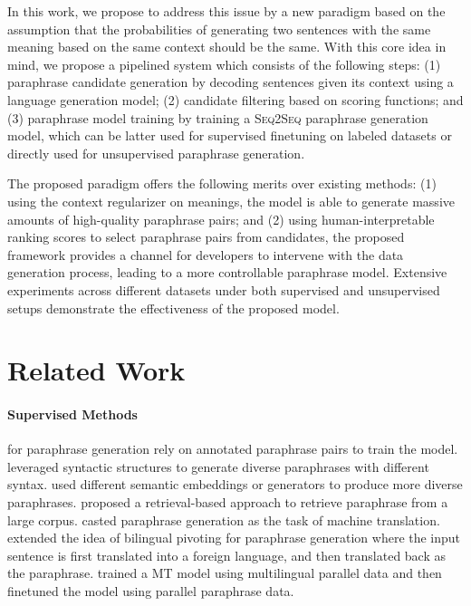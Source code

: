 \documentclass[11pt,a4paper]{article}
\newcommand{\sts}{{{\textsc{Seq2Seq}}}\xspace}
\begin{document}
In this work, we propose 
to address this issue 
by a new paradigm
based
 on the assumption that the probabilities of generating two sentences with the same meaning based on the same context should be the same.
  With this core idea in mind, 
  we propose a pipelined system which consists of  
  the following steps: 
(1) paraphrase candidate generation  by decoding  sentences given its context using a language generation model;
(2) candidate filtering based on scoring functions; and 
(3) paraphrase model training by
training a \sts paraphrase generation model, which can be latter used for supervised finetuning on labeled datasets or  directly used for unsupervised paraphrase generation. 
  
  

The proposed paradigm offers the following merits over existing methods: (1)
using the context regularizer on meanings, 
 the model is able to generate massive amounts 
 of high-quality paraphrase pairs; 
and (2)  using human-interpretable ranking scores to select paraphrase pairs from candidates, the proposed framework provides a channel for developers to intervene with the data generation process, leading
to a more controllable paraphrase model. 
Extensive experiments across different datasets under both supervised and unsupervised setups demonstrate 
the effectiveness of the proposed model. 

\section{Related Work}  

\paragraph{Supervised Methods} 
for paraphrase generation rely on annotated paraphrase pairs to train the model.
\citet{iyyer2018adversarial,li-etal-2019-decomposable,chen2019controllable,goyal2020neural} leveraged syntactic structures to generate diverse paraphrases with different syntax.
\citet{xu2018d,qian2019exploring} used different semantic embeddings or  generators to produce more diverse paraphrases.
\citet{kazemnejad-etal-2020-paraphrase} proposed a retrieval-based approach to retrieve paraphrase from  a large corpus.
\citet{mallinson2017paraphrasing,sokolov2020neural} casted paraphrase generation as the task of machine translation. \citet{mallinson2017paraphrasing,wieting2017learning} extended the idea of bilingual pivoting for paraphrase generation where the input sentence is first translated into a foreign language, and then translated back as the paraphrase. \citet{sokolov2020neural}  trained a MT model using multilingual parallel data and then finetuned the model using parallel paraphrase data. 
\end{document}

